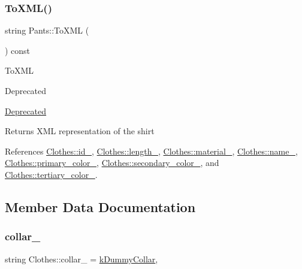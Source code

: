 \mbox{\label{classPants_aa62270b70cbb40b7b420f1091ad7e43b}} 
\subsubsection{\texorpdfstring{To\+X\+M\+L()}{ToXML()}}
{\footnotesize\ttfamily string Pants\+::\+To\+X\+ML (\begin{DoxyParamCaption}{ }\end{DoxyParamCaption}) const}

To\+X\+ML \begin{DoxyRefDesc}{Deprecated}
\item[\mbox{\hyperlink{deprecated__deprecated000002}{Deprecated}}]\end{DoxyRefDesc}


\begin{DoxyReturn}{Returns}
X\+ML representation of the shirt 
\end{DoxyReturn}


References \mbox{\hyperlink{classClothes_a8978d931db5ca47c3ccea30def4ae83e}{Clothes\+::id\+\_\+}}, \mbox{\hyperlink{classClothes_ae02603eda727e33caf46ec30e761e3c3}{Clothes\+::length\+\_\+}}, \mbox{\hyperlink{classClothes_adbb9ed311f14ccbb1e4fe0e8378a95d4}{Clothes\+::material\+\_\+}}, \mbox{\hyperlink{classClothes_a7f2275aaae24224d60c48af922c31b65}{Clothes\+::name\+\_\+}}, \mbox{\hyperlink{classClothes_a7cb005bf6cbb7f4eaa40f1b31817559c}{Clothes\+::primary\+\_\+color\+\_\+}}, \mbox{\hyperlink{classClothes_ab8f55f67b956b25d71260cffcf273673}{Clothes\+::secondary\+\_\+color\+\_\+}}, and \mbox{\hyperlink{classClothes_a3c5f1e7ab531e3ba7a38b930da8078a0}{Clothes\+::tertiary\+\_\+color\+\_\+}}.



\subsection{Member Data Documentation}
\mbox{\label{classClothes_ae2e5026257b3a2f2ddbf61757fd3b57b}} 
\subsubsection{\texorpdfstring{collar\+\_\+}{collar\_}}
{\footnotesize\ttfamily string Clothes\+::collar\+\_\+ = \mbox{\hyperlink{clothes_8h_ac06c9f556f68bcd2829e36c55b70a86e}{k\+Dummy\+Collar}}\hspace{0.3cm}{\ttfamily [protected]}, {\ttfamily [inherited]}}



